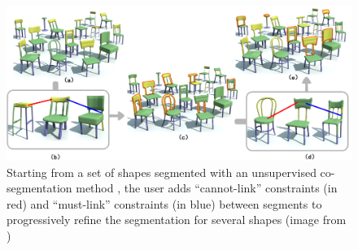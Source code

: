 \begin{figure}[t]
\centering
    \includegraphics[width=1.0\columnwidth]{fig/img/active_coanalysis.png}
    \vspace{-0.4cm}
    \caption{Starting from a set of shapes segmented with an unsupervised co-segmentation method \cite{Sidi:2011:CS}, the user 
    adds ``cannot-link'' constraints (in red) and ``must-link'' constraints (in blue) between segments to progressively refine the segmentation for several shapes (image from \cite{Wang:2012:ACS}) }
    \vspace{-0.6cm}
    \label{fig:active_coanalysis}
\end{figure}

